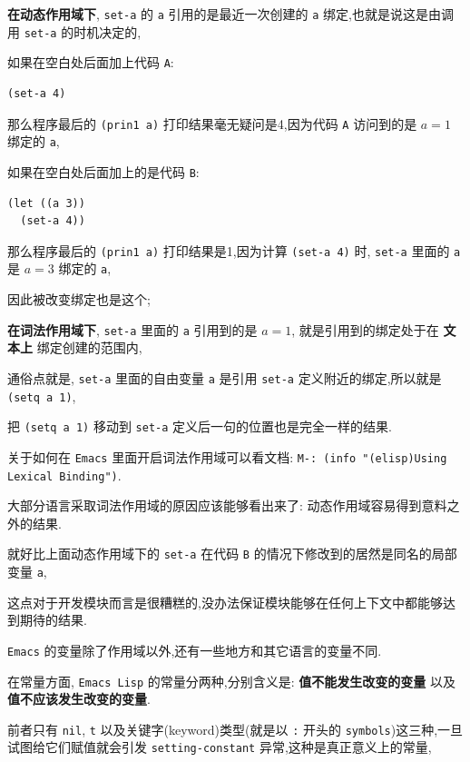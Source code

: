 \documentclass[11pt]{article}
\begin{document}
\textbf{在动态作用域下}, \texttt{set-a} 的 \texttt{a} 引用的是最近一次创建的 \texttt{a} 绑定,也就是说这是由调用 \texttt{set-a} 的时机决定的,

如果在空白处后面加上代码 \texttt{A}:

\begin{verbatim}
(set-a 4)
\end{verbatim}

那么程序最后的 \texttt{(prin1 a)} 打印结果毫无疑问是4,因为代码 \texttt{A} 访问到的是 \(a = 1\) 绑定的 \texttt{a},

如果在空白处后面加上的是代码 \texttt{B}:

\begin{verbatim}
(let ((a 3))
  (set-a 4))
\end{verbatim}

那么程序最后的 \texttt{(prin1 a)} 打印结果是1,因为计算 \texttt{(set-a 4)} 时, \texttt{set-a} 里面的 \texttt{a} 是 \(a = 3\) 绑定的 \texttt{a},

因此被改变绑定也是这个;

\textbf{在词法作用域下}, \texttt{set-a} 里面的 \texttt{a} 引用到的是 \(a = 1\), 就是引用到的绑定处于在 \textbf{文本上} 绑定创建的范围内,

通俗点就是, \texttt{set-a} 里面的自由变量 \texttt{a} 是引用 \texttt{set-a} 定义附近的绑定,所以就是 \texttt{(setq a 1)},

把 \texttt{(setq a 1)} 移动到 \texttt{set-a} 定义后一句的位置也是完全一样的结果.

关于如何在 \texttt{Emacs} 里面开启词法作用域可以看文档: \texttt{M-: (info "(elisp)Using Lexical Binding")}.


大部分语言采取词法作用域的原因应该能够看出来了: 动态作用域容易得到意料之外的结果.

就好比上面动态作用域下的 \texttt{set-a} 在代码 \texttt{B} 的情况下修改到的居然是同名的局部变量 \texttt{a},

这点对于开发模块而言是很糟糕的,没办法保证模块能够在任何上下文中都能够达到期待的结果.


\texttt{Emacs} 的变量除了作用域以外,还有一些地方和其它语言的变量不同.

在常量方面, \texttt{Emacs Lisp} 的常量分两种,分别含义是: \textbf{值不能发生改变的变量} 以及 \textbf{值不应该发生改变的变量}.

前者只有 \texttt{nil}, \texttt{t} 以及关键字(keyword)类型(就是以 \texttt{:} 开头的 \texttt{symbols})这三种,一旦试图给它们赋值就会引发 \texttt{setting-constant} 异常,这种是真正意义上的常量,
\end{document}
